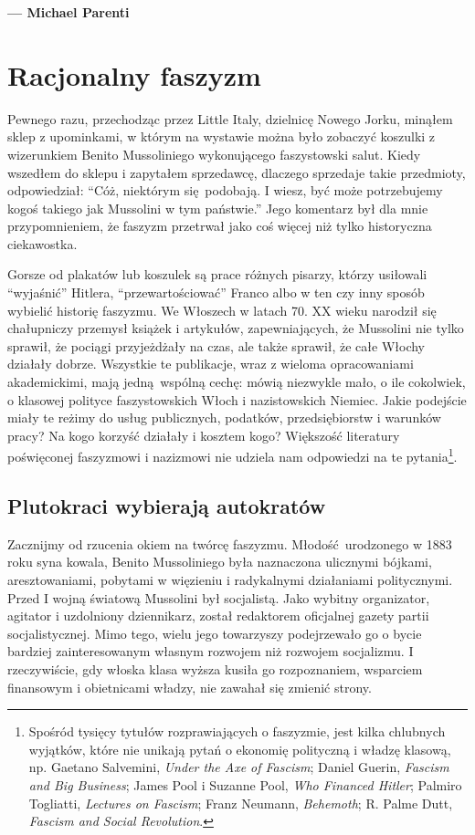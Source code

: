 \documentclass[12pt]{book}
\newcommand{\sekcja}[1]{
  \addcontentsline{toc}{section}{#1}
  \section*{#1}
}
\begin{document}
\begin{flushright}
  \textbf{--- Michael Parenti}
\end{flushright}

\mainmatter

\chapter{Racjonalny faszyzm}
Pewnego razu, przechodząc przez Little Italy, dzielnicę Nowego Jorku, minąłem sklep z upominkami, w którym na wystawie można było zobaczyć koszulki z wizerunkiem Benito Mussoliniego wykonującego faszystowski salut. Kiedy wszedłem do sklepu i zapytałem sprzedawcę, dlaczego sprzedaje takie przedmioty, odpowiedział: ``Cóż, niektórym się podobają. I wiesz, być może potrzebujemy kogoś takiego jak Mussolini w tym państwie.'' Jego komentarz był dla mnie przypomnieniem, że faszyzm przetrwał jako coś więcej niż tylko historyczna ciekawostka.

Gorsze od plakatów lub koszulek są prace różnych pisarzy, którzy usiłowali ``wyjaśnić'' Hitlera, ``przewartościować'' Franco albo w ten czy inny sposób wybielić historię faszyzmu. We Włoszech w latach 70. XX wieku narodził się chałupniczy przemysł książek i artykułów, zapewniających, że Mussolini nie tylko sprawił, że pociągi przyjeżdżały na czas, ale także sprawił, że całe Włochy działały dobrze. Wszystkie te publikacje, wraz z wieloma opracowaniami akademickimi, mają jedną wspólną cechę: mówią niezwykle mało, o ile cokolwiek, o klasowej polityce faszystowskich Włoch i nazistowskich Niemiec. Jakie podejście miały te reżimy do usług publicznych, podatków, przedsiębiorstw i warunków pracy? Na kogo korzyść działały i kosztem kogo? Większość literatury poświęconej faszyzmowi i nazizmowi nie udziela nam odpowiedzi na te pytania\footnote{Spośród tysięcy tytułów rozprawiających o faszyzmie, jest kilka chlubnych wyjątków, które nie unikają pytań o ekonomię polityczną i władzę klasową, np. Gaetano Salvemini, \textit{Under the Axe of Fascism}; Daniel Guerin, \textit{Fascism and Big Business}; James Pool i Suzanne Pool, \textit{Who Financed Hitler}; Palmiro Togliatti, \textit{Lectures on Fascism}; Franz Neumann, \textit{Behemoth}; R. Palme Dutt, \textit{Fascism and Social Revolution}.}.

\sekcja{Plutokraci wybierają autokratów}

Zacznijmy od rzucenia okiem na twórcę faszyzmu. Młodość urodzonego w 1883 roku syna kowala, Benito Mussoliniego była naznaczona ulicznymi bójkami, aresztowaniami, pobytami w więzieniu i radykalnymi działaniami politycznymi. Przed I wojną światową Mussolini był socjalistą. Jako wybitny organizator, agitator i uzdolniony dziennikarz, został redaktorem oficjalnej gazety partii socjalistycznej. Mimo tego, wielu jego towarzyszy podejrzewało go o bycie bardziej zainteresowanym własnym rozwojem niż rozwojem socjalizmu. I rzeczywiście, gdy włoska klasa wyższa kusiła go rozpoznaniem, wsparciem finansowym i obietnicami władzy, nie zawahał się zmienić strony.
\end{document}
